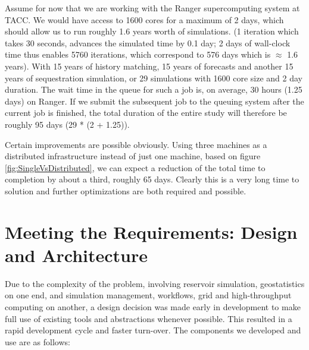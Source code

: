 \documentclass{acm_proc_article-sp}
\newcommand{\up}{\vspace*{-0.3em}}
\begin{document}
Assume for now that we are working with the Ranger supercomputing
system at TACC. We would have access to 1600 cores for a maximum of 2
days, which should allow us to run roughly 1.6 years worth of
simulations. (1 iteration which takes 30 seconds, advances the
simulated time by 0.1 day; 2 days of wall-clock time thus enables 5760
iterations, which correspond to 576 days which is $\approx$ 1.6
years). With 15 years of history matching, 15 years of forecasts and
another 15 years of sequestration simulation, or 29 simulations with
1600 core size and 2 day duration. The wait time in the queue for such
a job is, on average, 30 hours (1.25 days) on Ranger. If we submit the
subsequent job to the queuing system after the current job is
finished, the total duration of the entire study will therefore be
roughly 95 days (29 * (2 + 1.25)).

Certain improvements are possible obviously. Using three machines as a
distributed infrastructure instead of just one machine, based on figure
\ref{fig:SingleVsDistributed}, we can expect a reduction of the total
time to completion by about a third, roughly 65 days. Clearly this is
a very long time to solution and further optimizations are both
required and possible.
\up\up
% 

\up\up
\section{Meeting the Requirements: Design and Architecture}

Due to the complexity of the problem, involving reservoir simulation,
geostatistics on one end, and simulation management, workflows, grid
and high-throughput computing on another, a design decision was made
early in development to make full use of existing tools and
abstractions whenever possible. This resulted in a rapid development
cycle and faster turn-over. The components we developed and use are as
follows:
\end{document}
